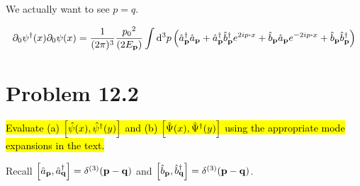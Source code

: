 \documentclass{article}
\begin{document}
We actually want to see $p=q$.

\begin{align*}
    \partial_0 \psi^\dagger (x)\partial_0 \psi(x) & =\frac{1}{(2\pi)^3}\frac{{p_0}^2}{(2E_{\vb{p}})}   \int    \dd[3]{p}  \pqty{\hat{a}^\dagger_{\vb{p}}\hat{a}_{\vb{p}}+\hat{a}^\dagger_{\vb{p}}\hat{b}^\dagger_{\vb{p}}e^{2ip\vdot x}+\hat{b}_{\vb{p}}\hat{a}_{\vb{p}}e^{-2ip\vdot x}+\hat{b}_{\vb{p}}\hat{b}^\dagger_{\vb{p}}} \\
\end{align*}



\section*{Problem 12.2}
\begin{quoting}
    \hl{Evaluate (a) $\bqty{\hat{\psi}(x),\hat{\psi}^\dagger (y)}$ and (b) $\bqty{\hat{\Psi}(x),\hat{\Psi}^\dagger (y)}$ using the appropriate mode expansions in the text.}
\end{quoting}

Recall $\bqty{\hat{a}_{\vb{p}},\hat{a}^\dagger_{\vb{q}}}=\delta^{(3)}(\vb{p}-\vb{q})$ and $\bqty{\hat{b}_{\vb{p}},\hat{b}^\dagger_{\vb{q}}}=\delta^{(3)}(\vb{p}-\vb{q})$.
\end{document}
